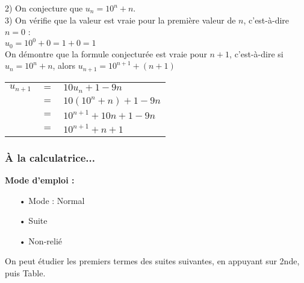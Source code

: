 2) On conjecture que $u_n = 10^n + n$. \\

3) On vérifie que la valeur est vraie pour la première valeur de $n$, c'est-à-dire $n = 0$ : \\

$u_0 = 10^0 + 0 = 1 + 0 = 1 $ \\

On démontre que la formule conjecturée est vraie pour $n + 1$, c'est-à-dire si $u_n = 10^n + n$, alors $u_{n+1} = 10^{n+1} + \left(n+1\right)$ \\

\begin{tabular}{lll}
$u_{n+1}$ & $=$ & $10u_n + 1 - 9n$ \\
& $=$ & $10\left(10^n + n\right) + 1 - 9n$ \\
& $=$ & $10^{n+1} + 10n + 1 - 9n $ \\
& $=$ & $10^{n+1} + n + 1$ \\
\end{tabular}

\subsubsection{À la calculatrice...}

\textbf{Mode d'emploi : }

\begin{itemize}
\item[•] Mode : Normal
\item[•] Suite
\item[•] Non-relié
\end{itemize}

\vspace*{.3cm}

On peut étudier les premiers termes des suites suivantes, en appuyant sur 2nde, puis Table. \\

